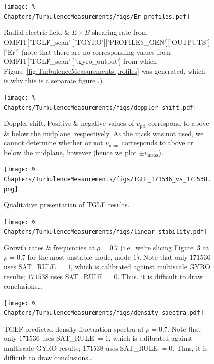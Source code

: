 \begin{figure}[h!]
  \centering
  \texttt{[image: \%
    Chapters/TurbulenceMeasurements/figs/Er\_profiles.pdf]}
  \caption[Radial electric field \& $E \times B$ shearing rate]{%
    Radial electric field \& $E \times B$ shearing rate from
    OMFIT['TGLF\_scan']['TGYRO']['PROFILES\_GEN']['OUTPUTS']['Er']
    (note that there are no corresponding values from
    OMFIT['TGLF\_scan']['tgyro\_output']
    from which Figure~\ref{fig:TurbulenceMeasurements:profiles}
    was generated, which is why this is a separate figure\ldots).
  }
\label{fig:TurbulenceMeasurements:Er_profiles}
\end{figure}

\begin{figure}[h!]
  \centering
  \texttt{[image: \%
    Chapters/TurbulenceMeasurements/figs/doppler\_shift.pdf]}
  \caption[Doppler shift]{%
    Doppler shift. Positive \& negative values of $v_{\text{pci}}$
    correspond to above \& below the midplane, respectively.
    As the mask was not used, we cannot determine whether or not
    $v_{\text{meas}}$ corresponds to above or below the midplane, however
    (hence we plot $\pm v_{\text{meas}}$).
  }
\label{fig:TurbulenceMeasurements:doppler_shift}
\end{figure}

\begin{figure}[h!]
  \centering
  \texttt{[image: \%
    Chapters/TurbulenceMeasurements/figs/TGLF\_171536\_vs\_171538.png]}
  \caption[Qualitative presentation of TGLF results]{%
    Qualitative presentation of TGLF results.
  }
\label{fig:TurbulenceMeasurements:TGLF_171536_vs_171538}
\end{figure}

\begin{figure}[h!]
  \centering
  \texttt{[image: \%
    Chapters/TurbulenceMeasurements/figs/linear\_stability.pdf]}
  \caption[Growth rates \& frequencies at $\rho=0.7$]{%
    Growth rates \& frequencies at $\rho=0.7$
    (i.e.\ we're slicing
    Figure~\ref{fig:TurbulenceMeasurements:TGLF_171536_vs_171538}
    at $\rho = 0.7$ for the most unstable mode, mode $1$).
    Note that only $171536$ uses SAT\_RULE $= 1$,
    which is calibrated against multiscale GYRO results;
    $171538$ uses SAT\_RULE $= 0$.
    Thus, it is difficult to draw conclusions\ldots
  }
\label{fig:TurbulenceMeasurements:linear_stability}
\end{figure}

\begin{figure}[h!]
  \centering
  \texttt{[image: \%
    Chapters/TurbulenceMeasurements/figs/density\_spectra.pdf]}
  \caption[TGLF-predicted density-fluctuation spectra at $\rho=0.7$]{%
    TGLF-predicted density-fluctuation spectra at $\rho=0.7$.
    Note that only $171536$ uses SAT\_RULE $= 1$,
    which is calibrated against multiscale GYRO results;
    $171538$ uses SAT\_RULE $= 0$.
    Thus, it is difficult to draw conclusions\ldots
  }
\label{fig:TurbulenceMeasurements:density_spectra}
\end{figure}




